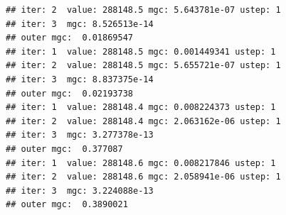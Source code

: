 \documentclass{article}\usepackage[]{graphicx}\usepackage[]{xcolor}
\makeatletter
\newenvironment{kframe}{%
 \def\at@end@of@kframe{}%
 \ifinner\ifhmode%
  \def\at@end@of@kframe{\end{minipage}}%
  \begin{minipage}{\columnwidth}%
 \fi\fi%
 \def\FrameCommand##1{\hskip\@totalleftmargin \hskip-\fboxsep
 \colorbox{shadecolor}{##1}\hskip-\fboxsep
     \hskip-\linewidth \hskip-\@totalleftmargin \hskip\columnwidth}%
 \MakeFramed {\advance\hsize-\width
   \@totalleftmargin\z@ \linewidth\hsize
   \@setminipage}}%
 {\par\unskip\endMakeFramed%
 \at@end@of@kframe}
\newenvironment{knitrout}{}{} %
\makeatother
\begin{document}
\begin{knitrout}
\begin{kframe}
\begin{verbatim}
## iter: 2  value: 288148.5 mgc: 5.643781e-07 ustep: 1 
## iter: 3  mgc: 8.526513e-14 
## outer mgc:  0.01869547 
## iter: 1  value: 288148.5 mgc: 0.001449341 ustep: 1 
## iter: 2  value: 288148.5 mgc: 5.655721e-07 ustep: 1 
## iter: 3  mgc: 8.837375e-14 
## outer mgc:  0.02193738 
## iter: 1  value: 288148.4 mgc: 0.008224373 ustep: 1 
## iter: 2  value: 288148.4 mgc: 2.063162e-06 ustep: 1 
## iter: 3  mgc: 3.277378e-13 
## outer mgc:  0.377087 
## iter: 1  value: 288148.6 mgc: 0.008217846 ustep: 1 
## iter: 2  value: 288148.6 mgc: 2.058941e-06 ustep: 1 
## iter: 3  mgc: 3.224088e-13 
## outer mgc:  0.3890021
\end{verbatim}
\end{kframe}
\end{knitrout}
\end{document}
